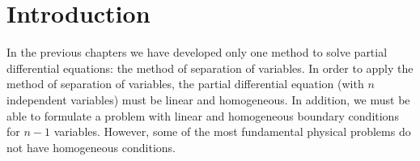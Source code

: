 \section{Introduction}
\label{sec:nonhomog-intro}

In the previous chapters we have developed only one method to solve partial differential equations: the method of separation of variables.  In order to apply the method of separation of variables, the partial differential equation (with $n$ independent variables) must be linear and homogeneous.  In addition, we must be able to formulate a problem with linear and homogeneous boundary conditions for $n-1$ variables.  However, some of the most fundamental physical problems do not have homogeneous conditions.
